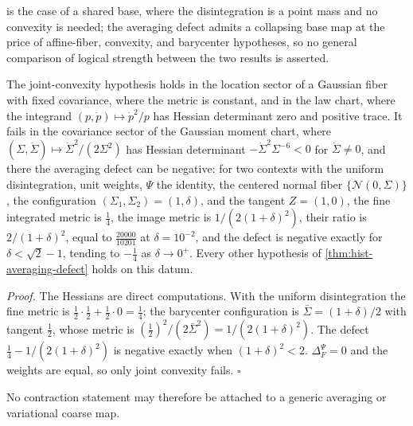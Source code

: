  is the case of a shared base, where
the disintegration is a point mass and no convexity is needed; the averaging
defect admits a collapsing base map at the price of affine-fiber, convexity, and
barycenter hypotheses, so no general comparison of logical strength between the
two results is asserted.

The joint-convexity hypothesis holds in the location sector of a Gaussian fiber
with fixed covariance, where the metric is constant, and in the law chart, where
the integrand \((p,\dot p)\mapsto\dot p^2/p\) has Hessian determinant zero and
positive trace. It fails in the covariance sector of the Gaussian moment chart,
where \((\Sigma,\dot\Sigma)\mapsto\dot\Sigma^2/(2\Sigma^2)\) has Hessian
determinant \(-\dot\Sigma^2\Sigma^{-6}<0\) for \(\dot\Sigma\ne0\), and there the
averaging defect can be negative: for two contexts with the uniform
disintegration, unit weights, \(\Psi\) the identity, the centered normal fiber
\(\{\mathcal N(0,\Sigma)\}\), the configuration \((\Sigma_1,\Sigma_2)=(1,\delta)\),
and the tangent \(Z=(1,0)\), the fine integrated metric is \(\tfrac14\), the
image metric is \(1/(2(1+\delta)^2)\), their ratio is \(2/(1+\delta)^2\), equal to
\(\tfrac{20000}{10201}\) at \(\delta=10^{-2}\), and the defect is negative exactly
for \(\delta<\sqrt2-1\), tending to \(-\tfrac14\) as \(\delta\to0^+\). Every other
hypothesis of \cref{thm:hist-averaging-defect} holds on this datum.

\noindent\emph{Proof.}
The Hessians are direct computations. With the uniform disintegration the fine
metric is \(\tfrac12\cdot\tfrac12+\tfrac12\cdot0=\tfrac14\); the barycenter
configuration is \(\bar\Sigma=(1+\delta)/2\) with tangent \(\tfrac12\), whose
metric is \((\tfrac12)^2/(2\bar\Sigma^2)=1/(2(1+\delta)^2)\). The defect
\(\tfrac14-1/(2(1+\delta)^2)\) is negative exactly when \((1+\delta)^2<2\).
\(\Delta_F^\Psi=0\) and the weights are equal, so only joint convexity fails.
\(\square\)

No contraction statement may therefore be attached to a generic averaging or
variational coarse map.

